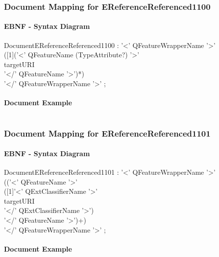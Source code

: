 \documentclass[11pt,a4paper]{article}
\begin{document}
\subsubsection{Document Mapping for EReferenceReferenced1100}
\paragraph{EBNF - Syntax Diagram}
\begin{rail}
DocumentEReferenceReferenced1100 : '<' QFeatureWrapperName '>' \\
([1]('<' QFeatureName (TypeAttribute?) '>'  \\
targetURI \\
'</' QFeatureName '>')*) \\
'</' QFeatureWrapperName '>' ;


\end{rail}

\paragraph{Document Example}
\inputminted[fontsize=\footnotesize]{xml}{examples/EReferenceReferenced1100.xml}


\subsubsection{Document Mapping for EReferenceReferenced1101}
\paragraph{EBNF - Syntax Diagram}
\begin{rail}
DocumentEReferenceReferenced1101 : '<' QFeatureWrapperName '>' \\
(('<' QFeatureName '>' \\
([1]'<' QExtClassifierName  '>' \\ 
targetURI \\ 
'</' QExtClassifierName  '>') \\
'</' QFeatureName '>')+) \\
'</' QFeatureWrapperName '>' ;
\end{rail}

\paragraph{Document Example}
\inputminted[fontsize=\footnotesize]{xml}{examples/EReferenceReferenced1101.xml}
\end{document}
